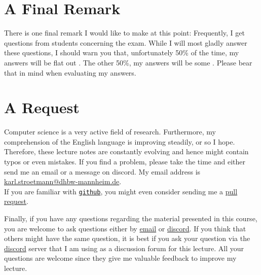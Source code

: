 \section{A Final Remark}
There is one final remark I would like to make at this point:  Frequently, I get questions from
students concerning the exam.  While I will most gladly  answer these questions, I should warn you
that, unfortunately 50\%
of the time, my answers will be flat out  .  The other 50\%,
my answers will be some  .  Please bear that in mind when evaluating my answers. 
\pagebreak

\section{A Request}
Computer science is a very active field of research.  Furthermore, my comprehension of the English
language is improving steadily, or so I hope.  Therefore, these lecture notes are constantly
evolving and hence might contain typos or even mistakes.  If you find a problem,
please take the time and either send me an email or a message on discord.  My email address is
\\[0.2cm]
\hspace*{1.3cm}
\href{mailto:karl.stroetmann@dhbw-mannheim.de}{karl.stroetmann@dhbw-mannheim.de}.
\\[0.2cm]
If you are familiar with \href{http://github.com}{\texttt{github}}, you might even consider
sending me a \href{https://help.github.com/articles/using-pull-requests}{pull request}.

Finally, if you have any questions regarding the material presented in this course, you are
welcome to ask questions either by \href{mailto:karl.stroetmann@dhbw-mannheim.de}{email} or
\href{https://discordapp.com}{discord}.  If you think that others might
have the same question, it is best if you ask your question via the \href{https://discordapp.com}{discord}
server that I am using as a discussion forum for this lecture.  All your questions are welcome since they give
me valuable feedback   to improve my lecture. 


